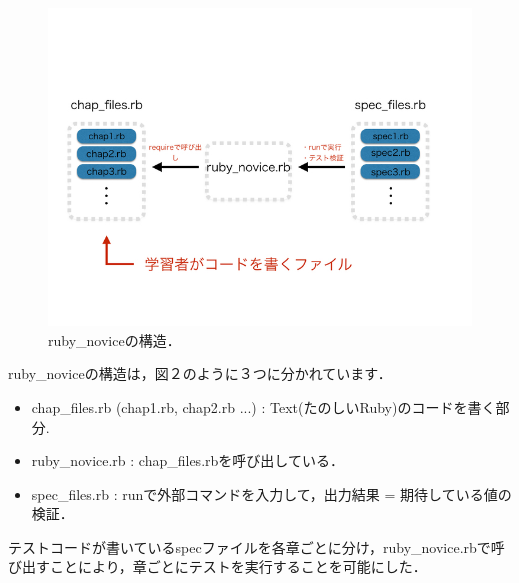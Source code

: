 \begin{figure}[H]\begin{center}
\includegraphics[width=12cm,bb= 0 0 737 553]{../figs/./ruby_novice.001.jpg}
\caption{ruby\_noviceの構造．}

\label{default}\end{center}\end{figure}
ruby\_noviceの構造は，図２のように３つに分かれています．
\begin{itemize}

\item chap\_files.rb (chap1.rb, chap2.rb ...) : Text(たのしいRuby)のコードを書く部分.

\item ruby\_novice.rb : chap\_files.rbを呼び出している．

\item spec\_files.rb : runで外部コマンドを入力して，出力結果 = 期待している値の検証．

\end{itemize}
テストコードが書いているspecファイルを各章ごとに分け，ruby\_novice.rbで呼び出すことにより，章ごとにテストを実行することを可能にした．

